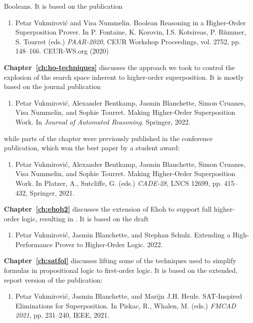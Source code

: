 Booleans. It is based on the publication
    \begin{enumerate}[resume]
      \item Petar Vukmirović and Visa Nummelin. Boolean Reasoning in a Higher-Order
      Superposition Prover. In P. Fontaine, K. Korovin, I.S. Kotsireas, P.
      R\"ummer, S. Tourret (eds.) \emph{PAAR-2020}, CEUR Workshop Proceedings, vol.
      2752, pp. 148--166. CEUR-WS.org (2020)
    \end{enumerate}
\noindent\textbf{Chapter~\ref{ch:ho-techniques}} discusses the approach we took to
control the explosion of the search space inherent to higher-order superposition. It is mostly based on the journal publication
  \begin{enumerate}[resume]
    \item Petar Vukmirović, Alexander Bentkamp, Jasmin Blanchette, Simon Cruanes, Visa Nummelin, and Sophie Tourret.
    Making Higher-Order Superposition Work. In \emph{Journal of Automated Reasoning}. Springer, 2022.
  \end{enumerate}
\vspace{-0.3em}
  while parts of the chapter were previously published in the conference publication, which won the best paper by a student award:
\vspace{-0.3em}
\begin{enumerate}[resume]
  \item Petar Vukmirović, Alexander Bentkamp, Jasmin Blanchette, Simon Cruanes, Visa Nummelin, and Sophie Tourret.
  Making Higher-Order Superposition Work. In Platzer, A., Sutcliffe, G. (eds.) \emph{CADE-28},
  LNCS 12699, pp. 415--432, Springer, 2021.
\end{enumerate}
\noindent\textbf{Chapter~\ref{ch:ehoh2}} discusses the extension of Ehoh to
support full higher-order logic, resulting in \newehoh.
It is based on the draft 
\begin{enumerate}[resume]
  \item Petar Vukmirović, Jasmin Blanchette, and Stephan Schulz.  Extending a
  High-Per\-for\-mance Prover to Higher-Order Logic. 2022.
\end{enumerate}

\noindent\textbf{Chapter~\ref{ch:satfol}} discusses lifting some of the techniques used to
simplify formulas in propositional logic to first-order logic. It is based on the extended, report version of the publication:
  \begin{enumerate}[resume]
    \item Petar Vukmirović, Jasmin Blanchette, and Marijn J.H. Heule. 
    SAT-Inspired Eliminations for Superposition. In Piskac, R., Whalen, M. (eds.) \emph{FMCAD 2021}, pp. 231--240, IEEE, 2021. 
  \end{enumerate}

